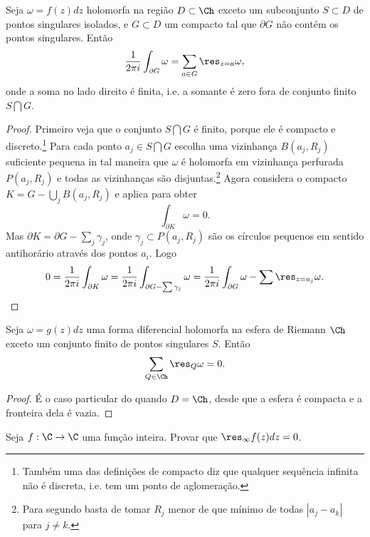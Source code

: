 \begin{teorema}
\label{t:residuos}
Seja $\omega = f(z) dz$ holomorfa na região $D \subset \Ch$ exceto um subconjunto $S\subset D$
de pontos singulares isolados, e $G\subset D$ um compacto tal que $\partial G$ não contém os pontos singulares.
Então
\begin{equation}
\frac{1}{2\pi i} \int_{\partial G} \omega = \sum_{a\in G} \res_{z=a} \omega,
\end{equation}
onde a soma no lado direito é finita,
i.e. a somante é zero fora de conjunto finito $S\bigcap G$.
\end{teorema}
\begin{proof}
Primeiro veja que o conjunto $S\bigcap G$ é finito,
porque ele é compacto e discreto.\footnote{Também uma das definições de compacto
diz que qualquer sequência infinita não é discreta, i.e. tem um ponto de aglomeração.}
Para cada ponto $a_j\in S\bigcap G$ escolha uma vizinhança $B(a_j,R_j)$ suficiente pequena
in tal maneira que $\omega$ é holomorfa em vizinhança perfurada $P(a_j,R_j)$
e todas as vizinhanças são disjuntas.\footnote{Para segundo basta de tomar $R_j$ menor de que
mínimo de todas $|a_j-a_k|$ para $j\neq k$.}
Agora considera o compacto $K = G - \bigcup_j B(a_j,R_j)$ e aplica  para obter
\[ \int_{\partial K} \omega = 0. \]
Mas $\partial K = \partial G - \sum_j \gamma_j$, onde $\gamma_j \subset P(a_j,R_j)$
são os círculos pequenos em sentido antihorário através dos pontos $a_i$.
Logo
\[ 0 = \frac{1}{2\pi i} \int_{\partial K} \omega = \frac{1}{2\pi i} \int_{\partial G - \sum \gamma_j} \omega
= \frac{1}{2\pi i} \int_{\partial G} \omega - \sum \res_{z=a_j} \omega. \]
\end{proof}

\begin{cor}
\label{reciprocidade-residuos}
Seja $\omega = g(z) dz$ uma forma diferencial holomorfa na esfera de Riemann $\Ch$
exceto um conjunto finito de pontos singulares $S$. Então
\begin{equation}
\sum_{Q\in\Ch} \res_Q \omega = 0.
\end{equation}
\end{cor}
\begin{proof}
É o caso particular do  quando $D = \Ch$,
desde que a esfera é compacta e a fronteira dela é vazia.
\end{proof}

\begin{problema}
Seja $f : \C \to \C$ uma função inteira. Provar que
$\res_\infty f(z) dz = 0$.
\end{problema}


